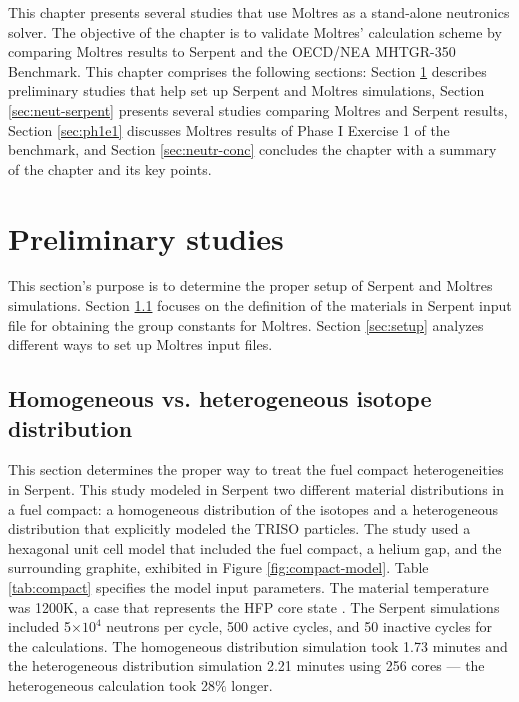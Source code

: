 \label{ch:neutronics}

This chapter presents several studies that use Moltres as a stand-alone neutronics solver.
The objective of the chapter is to validate Moltres' calculation scheme by comparing Moltres results to Serpent and the OECD/NEA MHTGR-350 Benchmark.
This chapter comprises the following sections: Section \ref{sec:neut-prelim} describes preliminary studies that help set up Serpent and Moltres simulations, Section \ref{sec:neut-serpent} presents several studies comparing Moltres and Serpent results, Section \ref{sec:ph1e1} discusses Moltres results of Phase I Exercise 1 of the benchmark, and Section \ref{sec:neutr-conc} concludes the chapter with a summary of the chapter and its key points.

\section{Preliminary studies}
\label{sec:neut-prelim}

This section's purpose is to determine the proper setup of Serpent and Moltres simulations.
Section \ref{sec:homo-hetero} focuses on the definition of the materials in Serpent input file for obtaining the group constants for Moltres.
Section \ref{sec:setup} analyzes different ways to set up Moltres input files.

\subsection{Homogeneous vs. heterogeneous isotope distribution}
\label{sec:homo-hetero}

This section determines the proper way to treat the fuel compact heterogeneities in Serpent.
This study modeled in Serpent two different material distributions in a fuel compact: a homogeneous distribution of the isotopes and a heterogeneous distribution that explicitly modeled the TRISO particles.
The study used a hexagonal unit cell model that included the fuel compact, a helium gap, and the surrounding graphite, exhibited in Figure \ref{fig:compact-model}.
Table \ref{tab:compact} specifies the model input parameters.
The material temperature was 1200K, a case that represents the \gls{HFP} core state \cite{strydom_results_2015}.
The Serpent simulations included 5$\times 10^4$ neutrons per cycle, 500 active cycles, and 50 inactive cycles for the calculations.
The homogeneous distribution simulation took 1.73 minutes and the heterogeneous distribution simulation 2.21 minutes using 256 cores --- the heterogeneous calculation took 28$\%$ longer.

